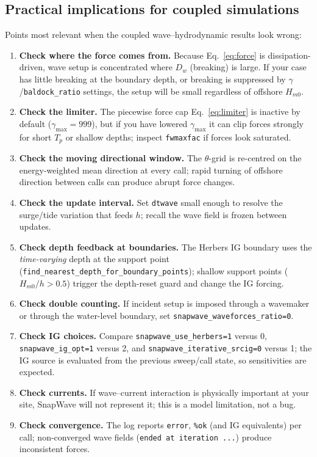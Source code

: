 \documentclass[11pt,a4paper]{article}
\newcommand{\code}[1]{\texttt{#1}}
\begin{document}
\subsection{Practical implications for coupled simulations}
\label{sec:implications}

Points most relevant when the coupled wave--hydrodynamic results look wrong:

\begin{enumerate}
  \item \textbf{Check where the force comes from.} Because
  Eq.~\eqref{eq:force} is dissipation-driven, wave setup is concentrated where
  $D_w$ (breaking) is large. If your case has little breaking at the boundary
  depth, or breaking is suppressed by $\gamma$/\code{baldock\_ratio} settings,
  the setup will be small regardless of offshore $H_{m0}$.
  \item \textbf{Check the limiter.} The piecewise force cap
  Eq.~\eqref{eq:limiter} is inactive by default ($\gamma_{\max}=999$), but if
  you have lowered $\gamma_{\max}$ it can clip forces strongly for short $T_p$
  or shallow depths; inspect \code{fwmaxfac} if forces look saturated.
  \item \textbf{Check the moving directional window.} The $\theta$-grid is
  re-centred on the energy-weighted mean direction at every call; rapid turning
  of offshore direction between calls can produce abrupt force changes.
  \item \textbf{Check the update interval.} Set \code{dtwave} small enough to
  resolve the surge/tide variation that feeds $h$; recall the wave field is
  frozen between updates.
  \item \textbf{Check depth feedback at boundaries.} The Herbers IG boundary
  uses the \emph{time-varying} depth at the support point
  (\code{find\_nearest\_depth\_for\_boundary\_points}); shallow support points
  ($H_{m0}/h>0.5$) trigger the depth-reset guard and change the IG forcing.
  \item \textbf{Check double counting.} If incident setup is imposed through a
  wavemaker or through the water-level boundary, set
  \code{snapwave\_waveforces\_ratio=0}.
  \item \textbf{Check IG choices.} Compare \code{snapwave\_use\_herbers=1}
  versus 0, \code{snapwave\_ig\_opt=1} versus 2, and
  \code{snapwave\_iterative\_srcig=0} versus 1; the IG source is evaluated from
  the previous sweep/call state, so sensitivities are expected.
  \item \textbf{Check currents.} If wave--current interaction is physically
  important at your site, SnapWave will not represent it; this is a model
  limitation, not a bug.
  \item \textbf{Check convergence.} The log reports \code{error}, \code{\%ok}
  (and IG equivalents) per call; non-converged wave fields
  (\code{ended at iteration ...}) produce inconsistent forces.
\end{enumerate}
\end{document}

